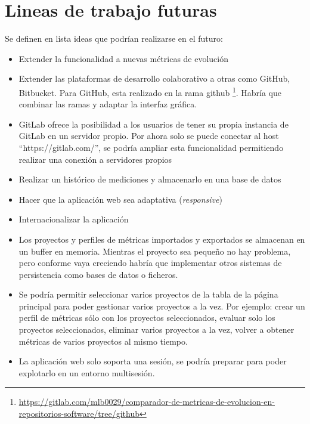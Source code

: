 \section{Lineas de trabajo futuras}

Se definen en lista ideas que podrían realizarse en el futuro:
\begin{itemize}
	\item Extender la funcionalidad a nuevas métricas de evolución
	\item Extender las plataformas de desarrollo colaborativo a otras como GitHub, Bitbucket. Para GitHub, esta realizado en la rama github \footnote{\url{https://gitlab.com/mlb0029/comparador-de-metricas-de-evolucion-en-repositorios-software/tree/github}}. Habría que combinar las ramas y adaptar la interfaz gráfica.
	\item GitLab ofrece la posibilidad a los usuarios de tener su propia instancia de GitLab en un servidor propio. Por ahora solo se puede conectar al host ``https://gitlab.com/'', se podría ampliar esta funcionalidad permitiendo realizar una conexión a servidores propios
	\item Realizar un histórico de mediciones y almacenarlo en una base de datos
	\item Hacer que la aplicación web sea adaptativa (\textit{responsive})
	\item Internacionalizar la aplicación
	\item Los proyectos y perfiles de métricas importados y exportados se almacenan en un buffer en memoria. Mientras el proyecto sea pequeño no hay problema, pero conforme vaya creciendo habría que implementar otros sistemas de persistencia como bases de datos o ficheros.
	\item Se podría permitir seleccionar varios proyectos de la tabla de la página principal para poder gestionar varios proyectos a la vez. Por ejemplo: crear un perfil de métricas sólo con los proyectos seleccionados, evaluar solo los proyectos seleccionados, eliminar varios proyectos a la vez, volver a obtener métricas de varios proyectos al mismo tiempo.
	\item La aplicación web solo soporta una sesión, se podría preparar para poder explotarlo en un entorno multisesión.
\end{itemize}